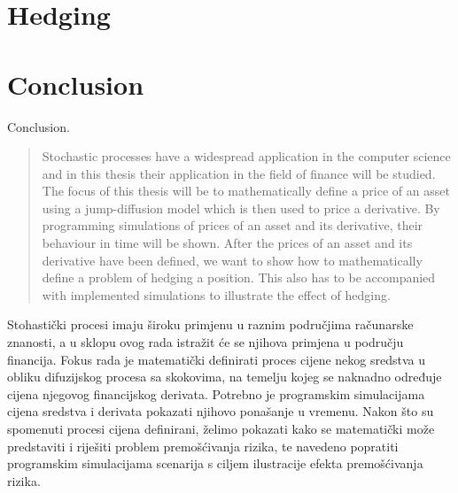 \documentclass[times, utf8, diplomski]{fer}
\begin{document}
\chapter{Hedging}
% 


\chapter{Conclusion}
Conclusion.



\nocite{*}

\listoffigures

\newpage
\begin{abstract}
Stochastic processes have a widespread application in the computer science and in this thesis their application in the field of finance will be studied. The focus of this thesis will be to mathematically define a price of an asset using a jump-diffusion model which is then used to price a derivative. By programming simulations of prices of an asset and its derivative, their behaviour in time will be shown. After the prices of an asset and its derivative have been defined, we want to show how to mathematically define a problem of hedging a position. This also has to be accompanied with implemented simulations to illustrate the effect of hedging.

\end{abstract}

\begin{sazetak}
Stohastički procesi imaju široku primjenu u raznim područjima računarske znanosti, a u sklopu ovog rada istražit će se njihova primjena u području financija. Fokus rada je matematički definirati proces cijene nekog sredstva u obliku difuzijskog procesa sa skokovima, na temelju kojeg se naknadno određuje cijena njegovog financijskog derivata. Potrebno je programskim simulacijama cijena sredstva i derivata pokazati njihovo ponašanje u vremenu. Nakon što su spomenuti procesi cijena definirani, želimo pokazati kako se matematički može predstaviti i riješiti problem premošćivanja rizika, te navedeno popratiti programskim simulacijama scenarija s ciljem ilustracije efekta premošćivanja rizika.

\end{sazetak}
\end{document}
